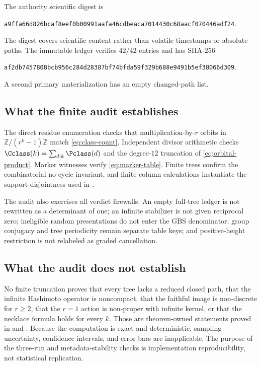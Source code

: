 The authority scientific digest is
\begin{center}
\small\nolinkurl{a9ffa66d826bcaf8eef0b00991aafa46cdbeaca7014430c68aacf070446adf24}.
\end{center}
The digest covers scientific content rather than volatile timestamps or
absolute paths.  The immutable ledger verifies $42/42$ entries and has
SHA-256
\begin{center}
\small\nolinkurl{af2db7457808bcb956c284d28387bf74bfda59f329b688e9491b5ef38066d309}.
\end{center}
A second primary materialization has an empty changed-path list.

\subsection{What the finite audit establishes}

The direct residue enumeration checks that multiplication-by-$r$ orbits in
$\mathbb Z/(r^k-1)\mathbb Z$ match \eqref{eq:class-count}.  Independent
divisor arithmetic checks
$\Cclass(k)=\sum_{d\mid k}\Pclass(d)$ and the degree-$12$ truncation of
\eqref{eq:orbital-product}.  Marker witnesses verify
\eqref{eq:marker-table}.  Finite trees confirm the combinatorial
no-cycle invariant, and finite column calculations instantiate the support
disjointness used in .

The audit also exercises all verdict firewalls.  An empty full-tree ledger is
not rewritten as a determinant of one; an infinite stabilizer is not given
reciprocal zero; ineligible random presentations do not enter the GBS
denominator; group conjugacy and tree periodicity remain separate table
keys; and positive-height restriction is not relabeled as graded
cancellation.

\subsection{What the audit does not establish}

No finite truncation proves that every tree lacks a reduced closed path,
that the infinite Hashimoto operator is noncompact, that the faithful image
is non-discrete for $r\ge2$, that the $r=1$ action is non-proper with infinite
kernel, or that the necklace formula holds for every $k$.  Those are
theorem-owned statements proved in
 and
.  Because the computation is exact and deterministic,
sampling uncertainty, confidence intervals, and error bars are inapplicable.
The purpose of the three-run and metadata-stability checks is implementation
reproducibility, not statistical replication.
